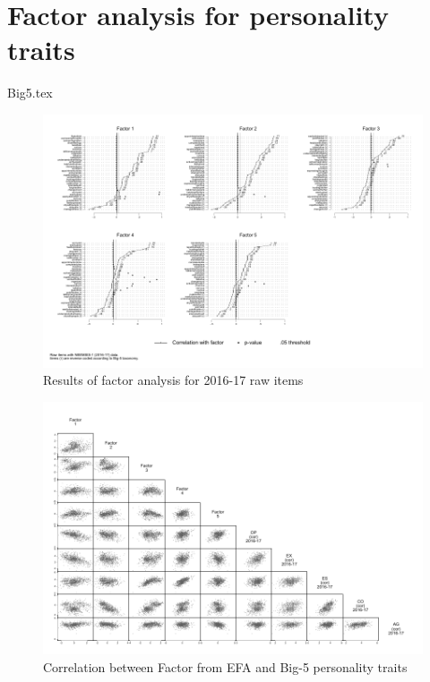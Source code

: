 \documentclass[a4paper, 12pt, onecolumn]{article}
\begin{document}
\clearpage
\newpage
\section{Factor analysis for personality traits}
\label{section:efa_big5}


{Big5.tex}

\clearpage
\begin{figure}[!htb]
\raggedright
\includegraphics[width=\textwidth, angle=0]{INPUT/factor2016_2}
\caption{Results of factor analysis for 2016-17 raw items}
\label{fig:resefa}
\end{figure}


\begin{figure}[!htb]
\raggedright
\includegraphics[scale=0.85]{INPUT/matrix_b5_efa}
\caption{Correlation between Factor from EFA and Big-5 personality traits}
\label{fig:descXY}
\end{figure}
\end{document}
